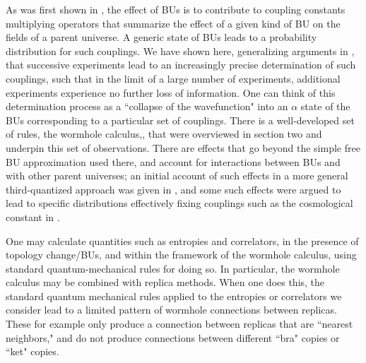 \documentclass[12pt]{article}
\numberwithin{equation}{section}
\begin{document}
As was first shown in \cite{Cole,GiStInc}, the effect of BUs is to contribute to coupling constants multiplying  operators that summarize the effect of a given kind of BU on the fields of a parent universe.  A generic state of BUs leads to a probability distribution for such couplings. We have shown here, generalizing arguments in \cite{Cole,GiStInc}, that successive experiments lead to an increasingly precise determination of such couplings, such that in the limit of a large number of experiments, additional experiments experience no further loss of information.  One can think of this determination process as a ``collapse of the wavefunction" into an $\alpha$ state of the BUs corresponding to a particular set of couplings.  There is a well-developed set of rules, the wormhole calculus,\cite{GiStInc},\cite{Cole} that were overviewed in section two and underpin this set of observations.  There are effects that go beyond the simple free BU approximation used there, and account for interactions between BUs and with other parent universes; an initial account of such effects in a more general third-quantized approach was given in \cite{GiSt3Q}, and some such effects were argued to lead to specific distributions effectively fixing couplings such as the cosmological constant in \cite{ColeCC}.

One may calculate quantities such as entropies and correlators, in the presence of topology change/BUs, and within the framework of the wormhole calculus, using standard quantum-mechanical rules for doing so.  In particular, the wormhole calculus may be combined with replica methods\cite{CaWi}.
When one does this, the standard quantum mechanical rules applied to the entropies or correlators we consider
lead to a limited pattern of wormhole connections between replicas.  These for example only produce a connection between replicas that are ``nearest neighbors," and do not produce connections between different ``bra" copies or ``ket" copies.
\end{document}
